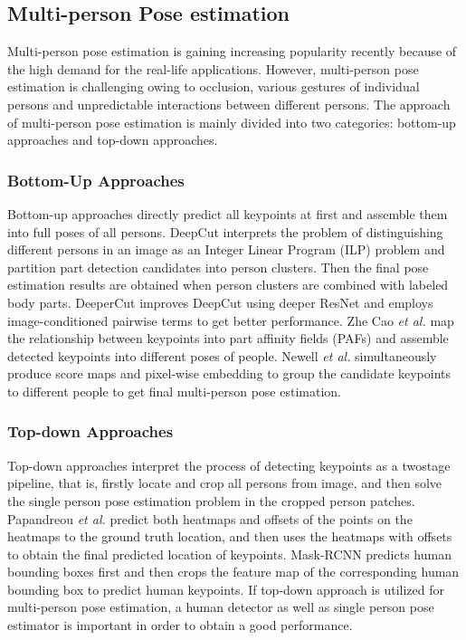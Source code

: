 \subsection{Multi-person Pose estimation}
Multi-person pose estimation is gaining increasing popularity recently because of the high demand for the real-life applications.
However, multi-person pose estimation is challenging owing to occlusion, various gestures of individual persons and unpredictable interactions between different persons.
The approach of multi-person pose estimation is mainly divided into two categories: bottom-up approaches and top-down approaches.

\subsubsection{Bottom-Up Approaches}

Bottom-up approaches\cite{newell2017associative, insafutdinov2016deepercut, pishchulin2016deepcut} directly predict all keypoints at first and assemble them into full poses of all persons.
DeepCut\cite{pishchulin2016deepcut} interprets the problem of distinguishing different persons in an image as an Integer Linear Program (ILP) problem and partition
part detection candidates into person clusters.
Then the final pose estimation results are obtained when person clusters are combined with labeled body parts.
DeeperCut\cite{insafutdinov2016deepercut} improves DeepCut\cite{pishchulin2016deepcut} using deeper ResNet\cite{he2016deep} and employs image-conditioned pairwise terms to get better performance.
Zhe Cao \textit{et al.}\cite{cao2016realtime} map the relationship between keypoints into part affinity fields (PAFs) and assemble detected keypoints into different poses of people.
Newell \textit{et al.}\cite{newell2017associative} simultaneously produce score maps and pixel-wise embedding to group the candidate keypoints to different people to get final multi-person pose estimation.

\subsubsection{Top-down Approaches}
Top-down approaches\cite{huang2017coarse, papandreou2017towards, he2017mask} interpret the process of detecting keypoints as a twostage pipeline, that is, firstly locate and crop all persons from image,
and then solve the single person pose estimation problem in the cropped person patches.
Papandreou \textit{et al.}\cite{papandreou2017towards} predict both heatmaps and offsets of the points on the heatmaps to the ground truth location, and then uses the heatmaps with offsets to obtain the final predicted location of keypoints.
Mask-RCNN\cite{he2017mask} predicts human bounding boxes first and then crops the feature map of the corresponding human bounding box to predict human keypoints.
If top-down approach is utilized for multi-person pose estimation, a human detector as well as single person pose estimator is important in order to obtain a good performance.

